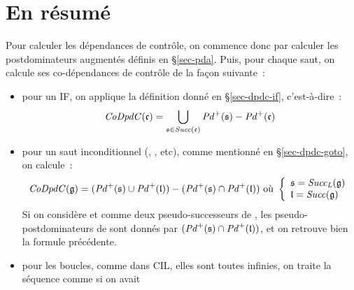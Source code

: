 \section{En résumé}

Pour calculer les dépendances de contrôle, on commence donc par calculer les
postdominateurs augmentés définis en \S\ref{sec-pda}.
Puis, pour chaque saut, on calcule ses co-dépendances de contrôle de la façon
suivante~:

\begin{itemize}
  \item pour un {\sc IF},
    on applique la définition donné en \S\ref{sec-dpdc-if},
    c'est-à-dire~:
$$
\mathit{CoDpdC}(\mathfrak{c}) = \bigcup_{ \mathfrak{s} \in \mathit{Succ}(\mathfrak{c})} \mathit{Pd}^{+}(\mathfrak{s}) - \mathit{Pd}^{+}(\mathfrak{c})
$$

  \item pour un saut inconditionnel (, , etc),
    comme mentionné en \S\ref{sec-dpdc-goto}, on calcule~:
$$
\mathit{CoDpdC}(\mathfrak{g}) = (\mathit{Pd}^{+}(\mathfrak{s}) \cup \mathit{Pd}^{+}(\mathfrak{l})) - (\mathit{Pd}^{+}(\mathfrak{s}) \cap \mathit{Pd}^{+}(\mathfrak{l}))
\mbox{  où } \left\{\begin{array}{l}
\mathfrak{s} = \mathit{Succ_{L}}(\mathfrak{g}) \\
\mathfrak{l} = \mathit{Succ}(\mathfrak{g})
\end{array}\right.
$$
Si on considère  et  comme deux pseudo-successeurs de ,
les pseudo-postdominateurs de  sont donnés par
$(\mathit{Pd}^{+}(\mathfrak{s}) \cap \mathit{Pd}^{+}(\mathfrak{l}))$, et on retrouve bien la formule précédente.

  \item pour les boucles, comme dans CIL, elles sont toutes infinies,
on traite la séquence 
comme si on avait 

\end{itemize}
